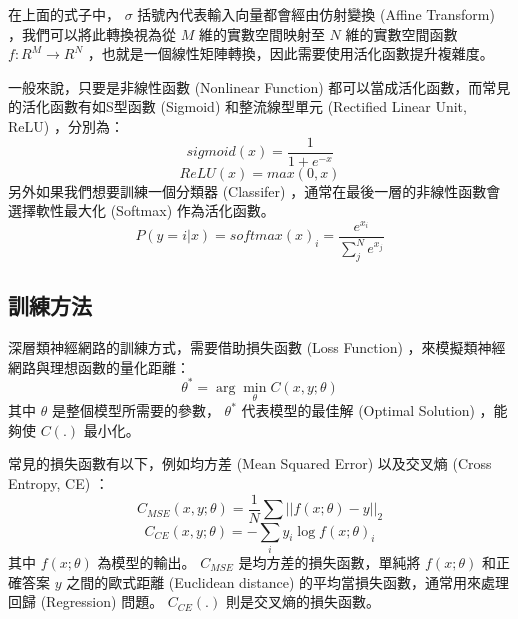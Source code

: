 在上面的式子中， $\sigma$ 括號內代表輸入向量都會經由仿射變換 (Affine Transform) ，我們可以將此轉換視為從 $M$ 維的實數空間映射至 $N$ 維的實數空間函數 $f:R^M \rightarrow R^N$ ，也就是一個線性矩陣轉換，因此需要使用活化函數提升複雜度。

一般來說，只要是非線性函數 (Nonlinear Function) 都可以當成活化函數，而常見的活化函數有如S型函數 (Sigmoid) 和整流線型單元 (Rectified Linear Unit, ReLU) ，分別為：
\begin{equation}
    sigmoid(x) = \frac{1}{1 + e^{-x}}
\end{equation}
\begin{equation}
    ReLU(x) = max(0,x)
\end{equation}
另外如果我們想要訓練一個分類器 (Classifer) ，通常在最後一層的非線性函數會選擇軟性最大化 (Softmax) 作為活化函數。
\begin{equation}
    P(y = i|x) = softmax(x)_{i} = \frac{e^{x_i}}{\sum_j^N e^{x_j}}
\end{equation}

\subsection{訓練方法}
深層類神經網路的訓練方式，需要借助損失函數 (Loss Function) ，來模擬類神經網路與理想函數的量化距離：
\begin{equation}
    \theta^{\ast} = \arg\min_{\theta}{C(x,y;\theta)}
\end{equation}
其中 $\theta$ 是整個模型所需要的參數， $\theta^{\ast}$ 代表模型的最佳解 (Optimal Solution) ，能夠使 $C(.)$ 最小化。

常見的損失函數有以下，例如均方差 (Mean Squared Error) 以及交叉熵 (Cross Entropy, CE) ：
\begin{equation}
    C_{MSE}(x,y;\theta) = \frac{1}{N}\sum||f(x;\theta) - y||_{2}
\end{equation}
\begin{equation}
    C_{CE}(x,y;\theta) = -\sum_i y_i\log f(x;\theta)_i
\end{equation}
其中 $f(x;\theta)$ 為模型的輸出。 $C_{MSE}$ 是均方差的損失函數，單純將 $f(x;\theta)$ 和正確答案 $y$ 之間的歐式距離 (Euclidean distance) 的平均當損失函數，通常用來處理回歸 (Regression) 問題。 $C_{CE}(.) $ 則是交叉熵的損失函數。

